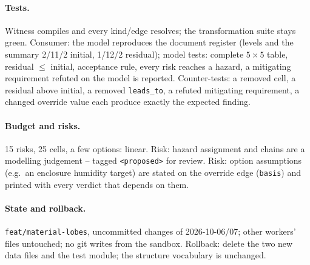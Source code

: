 \documentclass[11pt,a4paper]{article}
\begin{document}
\paragraph{Tests.} Witness compiles and every kind/edge resolves; the transformation suite stays
green. Consumer: the model reproduces the document register (levels and the summary 2/11/2 initial,
1/12/2 residual); model tests: complete $5\times5$ table, residual $\le$ initial, acceptance rule,
every risk reaches a hazard, a mitigating requirement refuted on the model is reported.
Counter-tests: a removed cell, a residual above initial, a removed \texttt{leads\_to}, a refuted
mitigating requirement, a changed override value each produce exactly the expected finding.
\paragraph{Budget and risks.} 15 risks, 25 cells, a few options: linear. Risk: hazard assignment
and chains are a modelling judgement -- tagged \texttt{<proposed>} for review. Risk: option
assumptions (e.g.\ an enclosure humidity target) are stated on the override edge (\texttt{basis})
and printed with every verdict that depends on them.
\paragraph{State and rollback.} \texttt{feat/material-lobes}, uncommitted changes of 2026-10-06/07;
other workers' files untouched; no git writes from the sandbox. Rollback: delete the two new data
files and the test module; the structure vocabulary is unchanged.
\begin{center}\end{center}
\end{document}
